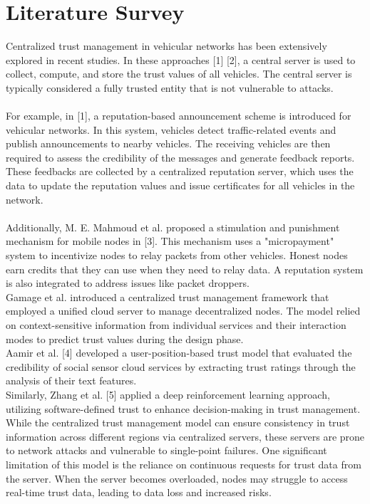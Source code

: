 \documentclass[11pt]{IEEEphot}
\begin{document}
\vspace{15pt}
\section{Literature Survey}
\vspace{5pt}
Centralized trust management in vehicular networks has been extensively explored in recent studies. In these approaches [1] [2], a central server is used to collect, compute, and store the trust values of all vehicles. The central server is typically considered a fully trusted entity that is not vulnerable to attacks.
\\
\\
For example, in [1], a reputation-based announcement scheme is introduced for vehicular networks. In this system, vehicles detect traffic-related events and publish announcements to nearby vehicles. The receiving vehicles are then required to assess the credibility of the messages and generate feedback reports. These feedbacks are collected by a centralized reputation server, which uses the data to update the reputation values and issue certificates for all vehicles in the network.
\\
\\
Additionally, M. E. Mahmoud et al. proposed a stimulation and punishment mechanism for mobile nodes in [3]. This mechanism uses a "micropayment" system to incentivize nodes to relay packets from other vehicles. Honest nodes earn credits that they can use when they need to relay data. A reputation system is also integrated to address issues like packet droppers.
\\
Gamage et al.  introduced a centralized trust management framework that employed a unified cloud server to manage decentralized nodes. The model relied on context-sensitive information from individual services and their interaction modes to predict trust values during the design phase. 
\\
Aamir et al. [4] developed a user-position-based trust model that evaluated the credibility of social sensor cloud services by extracting trust ratings through the analysis of their text features. 
\\
Similarly, Zhang et al. [5] applied a deep reinforcement learning approach, utilizing software-defined trust to enhance decision-making in trust management.
\\
While the centralized trust management model can ensure consistency in trust information across different regions via centralized servers, these servers are prone to network attacks and vulnerable to single-point failures. One significant limitation of this model is the reliance on continuous requests for trust data from the server. When the server becomes overloaded, nodes may struggle to access real-time trust data, leading to data loss and increased risks. 
\end{document}
